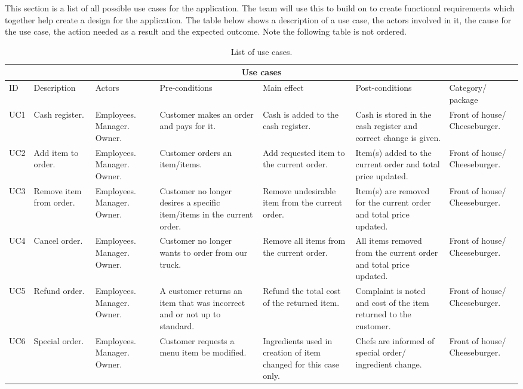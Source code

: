 This section is a list of all possible use cases for the application. The team will use this to build on to create functional requirements which together help create a design for the application. The table below shows a description of a use case, the actors involved in it, the cause for the use case, the action needed as a result and the expected outcome. Note the following table is not ordered.\\
\begin{table}[H]
\caption{List of use cases.}
\begin{tabularx}{\linewidth}{|X|X|X|X|X|X|X|}
\hline
\multicolumn{7}{c}{ Use cases } \\
\hline
ID & Description & Actors & Pre-conditions & Main effect & Post-conditions & Category/ package \\
\hline
UC1 & Cash register. & Employees. Manager. Owner. & Customer makes an order and pays for it. & Cash is added to the cash register. & Cash is stored in the cash register and correct change is given. & Front of house/ Cheeseburger. \\
\hline
UC2 & Add item to order. & Employees. Manager. Owner. & Customer orders an item/items. & Add requested item to the current order. & Item(s) added to the current order and total price updated. & Front of house/ Cheeseburger. \\
\hline
UC3 & Remove item from order. & Employees. Manager. Owner. & Customer no longer desires a specific item/items in the current order. & Remove undesirable item from the current order. & Item(s) are removed for the current order and total price updated. & Front of house/ Cheeseburger. \\
\hline
UC4 & Cancel order. & Employees. Manager. Owner. & Customer no longer wants to order from our truck. & Remove all items from the current order. & All items removed from the current order and total price updated. & Front of house/ Cheeseburger. \\
\hline
UC5 & Refund order. & Employees. Manager. Owner. & A customer returns an item that was incorrect and or not up to standard. & Refund the total cost of the returned item. & Complaint is noted and cost of the item returned to the customer. & Front of house/ Cheeseburger. \\
\hline
UC6 & Special order. & Employees. Manager. Owner. & Customer requests a menu item be modified. & Ingredients used in creation of item changed for this case only. & Chefs are informed of special order/ ingredient change. & Front of house/ Cheeseburger. \\

\end{tabularx}
\end{table}
